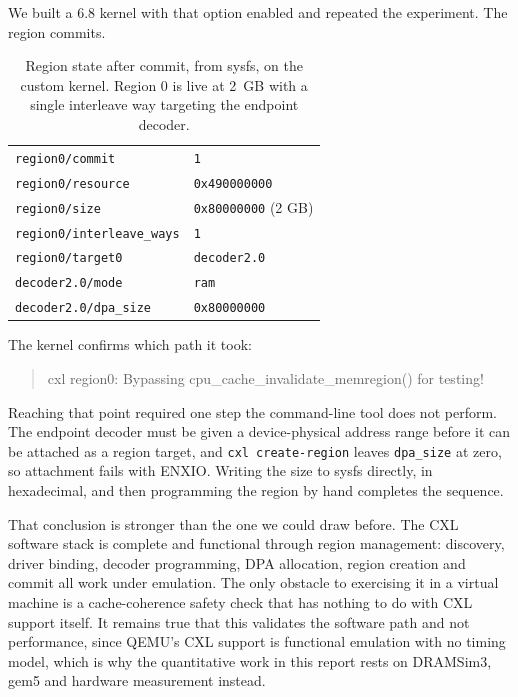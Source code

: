 \documentclass[10pt,a4paper]{article}
\begin{document}
We built a 6.8 kernel with that option enabled and repeated the experiment. The
region commits.

\begin{table}[htbp]
\centering\small
\caption{Region state after commit, from sysfs, on the custom kernel. Region 0
is live at 2~GB with a single interleave way targeting the endpoint decoder.}
\label{tab:cxlregion}
\begin{tabular}{ll}
\toprule
\texttt{region0/commit} & \texttt{1} \\
\texttt{region0/resource} & \texttt{0x490000000} \\
\texttt{region0/size} & \texttt{0x80000000} (2 GB) \\
\texttt{region0/interleave\_ways} & \texttt{1} \\
\texttt{region0/target0} & \texttt{decoder2.0} \\
\texttt{decoder2.0/mode} & \texttt{ram} \\
\texttt{decoder2.0/dpa\_size} & \texttt{0x80000000} \\
\bottomrule
\end{tabular}
\end{table}

The kernel confirms which path it took:

\begin{quote}\ttfamily\small
cxl region0: Bypassing cpu\_cache\_invalidate\_memregion() for testing!
\end{quote}

Reaching that point required one step the command-line tool does not perform.
The endpoint decoder must be given a device-physical address range before it
can be attached as a region target, and \texttt{cxl create-region} leaves
\texttt{dpa\_size} at zero, so attachment fails with ENXIO. Writing the size to
sysfs directly, in hexadecimal, and then programming the region by hand
completes the sequence.

That conclusion is stronger than the one we could draw before. The CXL software
stack is complete and functional through region management: discovery, driver
binding, decoder programming, DPA allocation, region creation and commit all
work under emulation. The only obstacle to exercising it in a virtual machine
is a cache-coherence safety check that has nothing to do with CXL support
itself. It remains true that this validates the software path and not
performance, since QEMU's CXL support is functional emulation with no timing
model, which is why the quantitative work in this report rests on DRAMSim3,
gem5 and hardware measurement instead.
\end{document}
